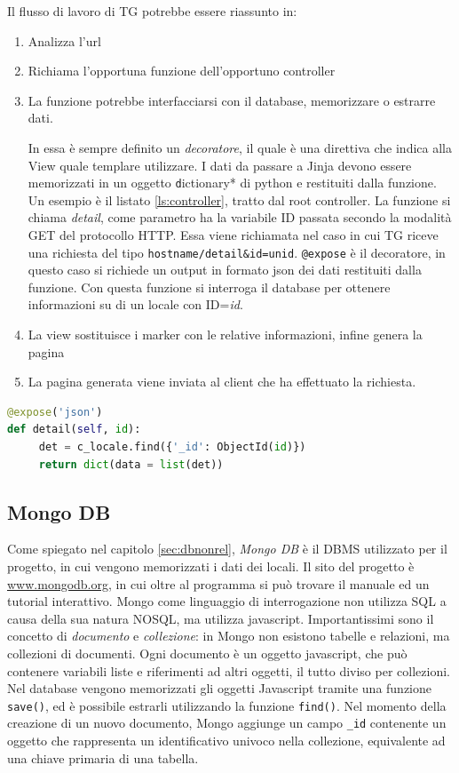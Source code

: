 Il flusso di lavoro di TG potrebbe essere riassunto in:
\begin{enumerate}
\item Analizza l'url
\item Richiama l'opportuna funzione dell'opportuno controller
\item La funzione potrebbe interfacciarsi con il database, memorizzare o estrarre dati. 

In essa è sempre definito un \emph{decoratore}, il quale è una direttiva che indica alla View quale templare utilizzare. I dati da passare a Jinja devono essere memorizzati in un oggetto \texttt*dictionary* di python e restituiti dalla funzione. Un esempio è il listato \ref{ls:controller}, tratto dal root controller. La funzione si chiama \emph{detail}, come parametro ha la variabile ID passata secondo la modalità GET del protocollo HTTP. Essa viene richiamata nel caso in cui TG riceve una richiesta del tipo \texttt{hostname/detail\&id=unid}. \texttt{@expose} \`e il decoratore, in questo caso si richiede un output in formato json dei dati restituiti dalla funzione. Con questa funzione si interroga il database per ottenere informazioni su di un locale con ID=\emph{id}.
\item La view sostituisce i marker con le relative informazioni, infine genera la pagina
\item La pagina generata viene inviata al client che ha effettuato la richiesta.
\end{enumerate}

\begin{lstlisting}[label=ls:controller,caption={Esempio di funzione di un controller tratta dal root controller.},language=Python]
@expose('json')
def detail(self, id):
     det = c_locale.find({'_id': ObjectId(id)})
     return dict(data = list(det))
\end{lstlisting}

		
\subsection{Mongo DB}\label{sec:mongo}
Come spiegato nel capitolo \ref{sec:dbnonrel}, \emph{Mongo DB} è il DBMS utilizzato per il progetto, in cui vengono memorizzati i dati dei locali. Il sito del progetto è \url{www.mongodb.org}, in cui oltre al programma si può trovare il manuale ed un tutorial interattivo. Mongo come linguaggio di interrogazione non utilizza SQL a causa della sua natura NOSQL, ma utilizza javascript. Importantissimi sono il concetto di \emph{documento} e \emph{collezione}: in Mongo non esistono tabelle e relazioni, ma collezioni di documenti. Ogni documento è un oggetto javascript, che può contenere variabili liste e riferimenti ad altri oggetti, il tutto diviso per collezioni. Nel database vengono memorizzati gli oggetti Javascript tramite una funzione \texttt{save()}, ed è possibile estrarli utilizzando la funzione \texttt{find()}. Nel momento della creazione di un nuovo documento, Mongo aggiunge un campo \texttt{\_id} contenente un oggetto che rappresenta un identificativo univoco nella collezione, equivalente ad una chiave primaria di una tabella.

